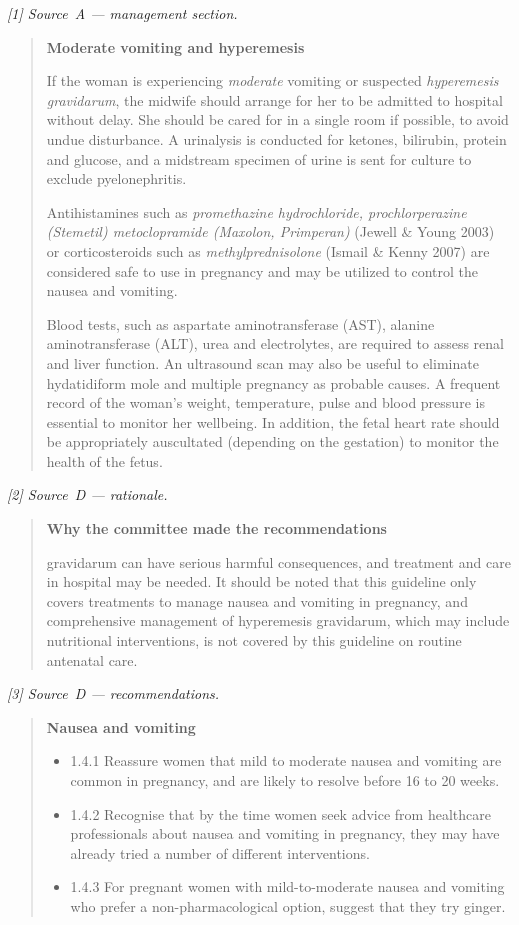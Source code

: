\smallskip
\noindent\emph{[1] Source~A --- management section.}
\begin{quote}\footnotesize
\textbf{Moderate vomiting and hyperemesis}

If the woman is experiencing \emph{moderate} vomiting or suspected
\emph{hyperemesis gravidarum}, the midwife should arrange for her to be admitted
to hospital without delay. She should be cared for in a single room if possible,
to avoid undue disturbance. A urinalysis is conducted for ketones, bilirubin,
protein and glucose, and a midstream specimen of urine is sent for culture to
exclude pyelonephritis.

Antihistamines such as \emph{promethazine hydrochloride, prochlorperazine
(Stemetil) metoclopramide (Maxolon, Primperan)} (Jewell \& Young 2003) or
corticosteroids such as \emph{methylprednisolone} (Ismail \& Kenny 2007) are
considered safe to use in pregnancy and may be utilized to control the nausea
and vomiting.

Blood tests, such as aspartate aminotransferase (AST), alanine aminotransferase
(ALT), urea and electrolytes, are required to assess renal and liver function.
An ultrasound scan may also be useful to eliminate hydatidiform mole and
multiple pregnancy as probable causes. A frequent record of the woman's weight,
temperature, pulse and blood pressure is essential to monitor her wellbeing. In
addition, the fetal heart rate should be appropriately auscultated (depending on
the gestation) to monitor the health of the fetus.
\end{quote}

\noindent\emph{[2] Source~D --- rationale.}
\begin{quote}\footnotesize
\textbf{Why the committee made the recommendations}

gravidarum can have serious harmful consequences, and treatment and care in
hospital may be needed. It should be noted that this guideline only covers
treatments to manage nausea and vomiting in pregnancy, and comprehensive
management of hyperemesis gravidarum, which may include nutritional
interventions, is not covered by this guideline on routine antenatal care.
\end{quote}

\noindent\emph{[3] Source~D --- recommendations.}
\begin{quote}\footnotesize
\textbf{Nausea and vomiting}
\begin{itemize}\setlength{\itemsep}{1pt}
  \item 1.4.1 Reassure women that mild to moderate nausea and vomiting are
  common in pregnancy, and are likely to resolve before 16 to 20 weeks.
  \item 1.4.2 Recognise that by the time women seek advice from healthcare
  professionals about nausea and vomiting in pregnancy, they may have already
  tried a number of different interventions.
  \item 1.4.3 For pregnant women with mild-to-moderate nausea and vomiting who
  prefer a non-pharmacological option, suggest that they try ginger.
\end{itemize}
\end{quote}

